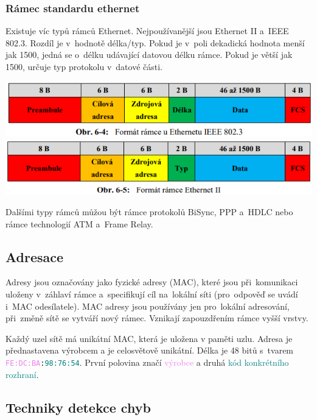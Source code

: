 \subsubsection{Rámec standardu ethernet}

Existuje víc typů rámců Ethernet. Nejpoužívanější jsou Ethernet II a~IEEE 802.3. Rozdíl je v~hodnotě délka/typ. Pokud je v~poli dekadická hodnota menší jak 1500, jedná se o~délku udávající datovou délku rámce. Pokud je větší jak 1500, určuje typ protokolu v~datové části.

\begin{center}
    \includegraphics[scale= 0.53]{images/-023.png}
    \includegraphics[scale= 0.53]{images/-024.png}
\end{center}

Dalšími typy rámců můžou být rámce protokolů BiSync, PPP a~HDLC nebo rámce technologií ATM a~Frame Relay.

\subsection{Adresace}

Adresy jsou označovány jako fyzické adresy (MAC), které jsou při~komunikaci uloženy v~záhlaví rámce a~specifikují cíl na~lokální síti (pro~odpověď se uvádí i~MAC odesílatele). MAC adresy jsou používány jen pro~lokální adresování, při~změně sítě se vytváří nový rámec. Vznikají zapouzdřením rámce vyšší vrstvy.

Každý uzel sítě má unikátní MAC, která je uložena v paměti uzlu. Adresa je přednastavena výrobcem a je celosvětově unikátní. Délka je 48 bitů s~tvarem \texttt{\textcolor{violet}{FE:DC:BA}:\textcolor{teal}{98:76:54}}. První polovina značí \textcolor{violet}{výrobce} a druhá \textcolor{teal}{kód konkrétního rozhraní}.

\subsection{Techniky detekce chyb}

